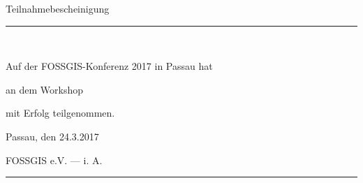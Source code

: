 \documentclass[a4paper, 12pt]{letter}
\begin{document}
{  \begin{center}

    \vspace*{4mm}
    \Huge Teilnahmebescheinigung
    \noindent\rule{0.9\textwidth}{1pt}\\
    
    \vspace*{14mm}
    
    \large
    
    Auf der FOSSGIS-Konferenz 2017 in Passau hat\\
    
    \vspace*{5mm}
    
    \Huge
    \person
    
    \vspace*{5mm}
    
    \large
    an dem Workshop
    
    \vspace*{5mm}

    \begin{minipage}{0.7\textwidth}
      \centering\bf\StrBehind[2]{\produkt}{-} %
    \end{minipage}

    \vspace*{5mm}
    
    mit Erfolg teilgenommen.
    
  \end{center}


  \vspace*{18mm}

  \large
  \hskip 1cm Passau, den 24.3.2017
  
  \vspace*{12mm}
  
  \hskip 1cm FOSSGIS e.V. --- i. A. \rule{0.5\textwidth}{0.5pt}
  
  \newpage
} 
\end{document}
